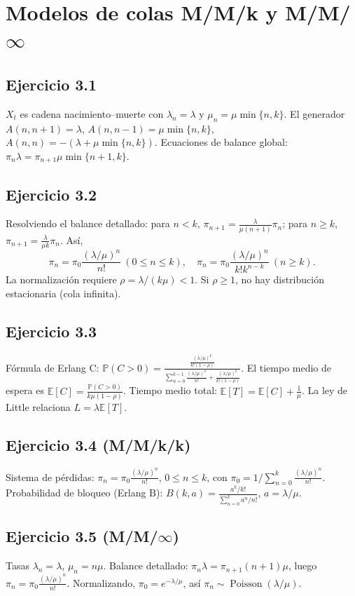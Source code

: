 \documentclass[letterpaper, 12pt]{article}
\newcommand{\E}{\mathbb{E}}
\renewcommand{\P}{\mathbb{P}}
\newcommand{\1}{\mathbbm{1}}
\DeclareMathOperator{\Poisson}{Poisson}
\begin{document}
    \section{Modelos de colas M/M/k y M/M/$\infty$}

    \subsection{Ejercicio 3.1}
    $X_t$ es cadena nacimiento--muerte con $\lambda_n=\lambda$ y $\mu_n=\mu\min\{n,k\}$. El generador $A(n,n+1)=\lambda$, $A(n,n-1)=\mu\min\{n,k\}$, $A(n,n)=-(\lambda+\mu\min\{n,k\})$. Ecuaciones de balance global: $\pi_n\lambda=\pi_{n+1}\mu\min\{n+1,k\}$.

    \subsection{Ejercicio 3.2}
    Resolviendo el balance detallado: para $n<k$, $\pi_{n+1}=\frac{\lambda}{\mu(n+1)}\pi_n$; para $n\ge k$, $\pi_{n+1}=\frac{\lambda}{\mu k}\pi_n$. As\'i,
    \[
    \pi_n = \pi_0\frac{(\lambda/\mu)^n}{n!}\ (0\le n\le k),\quad \pi_n = \pi_0\frac{(\lambda/\mu)^n}{k!k^{n-k}}\ (n\ge k).
    \]
    La normalizaci\'on requiere $\rho=\lambda/(k\mu)<1$. Si $\rho\ge1$, no hay distribuci\'on estacionaria (cola infinita).

    \subsection{Ejercicio 3.3}
    F\'ormula de Erlang C: $\P(C>0)=\frac{\frac{(\lambda/\mu)^k}{k!(1-\rho)}}{\sum_{n=0}^{k-1}\frac{(\lambda/\mu)^n}{n!}+\frac{(\lambda/\mu)^k}{k!(1-\rho)}}$. El tiempo medio de espera es $\E[C]=\frac{\P(C>0)}{k\mu(1-\rho)}$. Tiempo medio total: $\E[T]=\E[C]+\frac1\mu$. La ley de Little relaciona $L=\lambda\E[T]$.

    \subsection{Ejercicio 3.4 (M/M/k/k)}
    Sistema de p\'erdidas: $\pi_n=\pi_0\frac{(\lambda/\mu)^n}{n!}$, $0\le n\le k$, con $\pi_0=1/\sum_{n=0}^k\frac{(\lambda/\mu)^n}{n!}$. Probabilidad de bloqueo (Erlang B): $B(k,a)=\frac{a^k/k!}{\sum_{n=0}^k a^n/n!}$, $a=\lambda/\mu$.

    \subsection{Ejercicio 3.5 (M/M/$\infty$)}
    Tasas $\lambda_n=\lambda$, $\mu_n=n\mu$. Balance detallado: $\pi_n\lambda=\pi_{n+1}(n+1)\mu$, luego $\pi_n=\pi_0\frac{(\lambda/\mu)^n}{n!}$. Normalizando, $\pi_0=e^{-\lambda/\mu}$, as\'i $\pi_n\sim\Poisson(\lambda/\mu)$.
\end{document}
